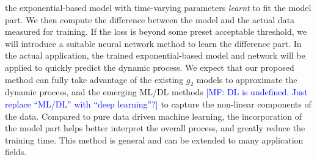 the exponential-based model with time-varying parameters {\em learnt} to fit the model part. We then compute the difference between the model and the actual data measured for training. If the loss is beyond some preset acceptable threshold, we will introduce a suitable neural network method to learn the difference part. In the actual application, the trained exponential-based model and  network will be applied to quickly predict the dynamic process.
We expect that our proposed method can fully take advantage of the existing $g_2$ models to approximate the dynamic process, and the emerging ML/DL methods 
\textcolor{blue}{[MF: DL is undefined. Just replace ``ML/DL'' with ``deep learning''?]} to capture the non-linear components of the data. Compared to pure data driven machine learning, the incorporation of the  model part helps better interpret the overall process, and greatly reduce the training time.
This method is general and can be  extended to many application fields.








